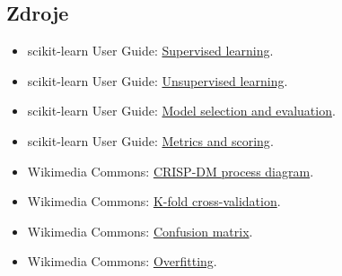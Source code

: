 \subsection{Zdroje}
\begin{itemize}
    \item scikit-learn User Guide:
    \href{https://scikit-learn.org/stable/supervised\_learning.html}{Supervised learning}.
    \item scikit-learn User Guide:
    \href{https://scikit-learn.org/stable/unsupervised\_learning.html}{Unsupervised learning}.
    \item scikit-learn User Guide:
    \href{https://scikit-learn.org/stable/model\_selection.html}{Model selection and evaluation}.
    \item scikit-learn User Guide:
    \href{https://scikit-learn.org/stable/modules/model\_evaluation.html}{Metrics and scoring}.
    \item Wikimedia Commons:
    \href{https://commons.wikimedia.org/wiki/File:CRISP-DM\_Process\_Diagram.png}{CRISP-DM process diagram}.
    \item Wikimedia Commons:
    \href{https://commons.wikimedia.org/wiki/File:K-fold\_cross\_validation\_EN.svg}{K-fold cross-validation}.
    \item Wikimedia Commons:
    \href{https://commons.wikimedia.org/wiki/File:ConfusionMatrix.png}{Confusion matrix}.
    \item Wikimedia Commons:
    \href{https://commons.wikimedia.org/wiki/File:Overfitting.svg}{Overfitting}.
\end{itemize}

\newpage

